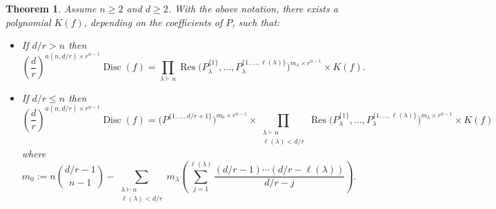 \documentclass[12pt]{amsart}
\newtheorem{theorem}{Theorem}[section]
\theoremstyle{definition}
\newcommand{\Res}{\operatorname{Res}}
\newcommand{\Disc}{\operatorname{Disc}}
\DeclareMathOperator{\len}{\ell}
\begin{document}
\begin{theorem}
\label{thm:disc1}
Assume $n \geqslant 2$ and $d \geqslant 2$. With the above notation, there exists a polynomial $K(f)$, depending on the coefficients of $P$, such that:
\begin{itemize}
\item If $d/r > n$ then
\[
\left(\frac{d}{r}\right)^{a(n,d/r)\times r^{n-1}}\Disc(f) = \prod_{\lambda\vdash n} \Res\Big(P^{\{1\}}_\lambda,\dots,P^{\{1,\dots,\len(\lambda)\}}_\lambda\Big)^{m_\lambda\times r^{n-1}} \times K(f).
\]
\item If $d/r \leqslant n$ then
\[
\left(\frac{d}{r}\right)^{a(n,d/r)\times r^{n-1}}\Disc(f) = \Big(P^{\{1,\dots,d/r+1\}}\Big)^{m_0\times r^{n-1}} \times \prod_{\substack{\lambda\vdash n\\ \len(\lambda)<d/r}} \Res\Big(P^{\{1\}}_\lambda,\dots,P^{\{1,\dots,\len(\lambda)\}}_\lambda\Big)^{m_\lambda\times r^{n-1}} \times K(f)
\]
where
\[
m_0 := n\binom{d/r-1}{n-1} - \sum_{\substack{\lambda\vdash n\\ \len(\lambda)<d/r}} m_\lambda\left(\sum_{j=1}^{\len(\lambda)}\frac{(d/r-1)\cdots(d/r-\len(\lambda))}{d/r-j}\right).
\]
\end{itemize}
\end{theorem}
\end{document}
